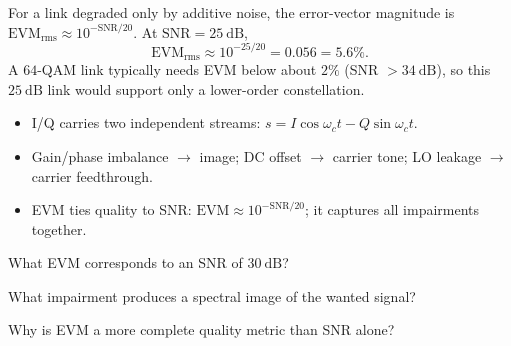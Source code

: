 \begin{workedexample}
For a link degraded only by additive noise, the error-vector magnitude is
$\text{EVM}_{\text{rms}} \approx 10^{-\text{SNR}/20}$. At $\text{SNR} = 25\ \text{dB}$,
\[ \text{EVM}_{\text{rms}} \approx 10^{-25/20} = 0.056 = 5.6\%. \]
A $64$-QAM link typically needs EVM below about $2\%$ (SNR $>34\ \text{dB}$), so
this $25\ \text{dB}$ link would support only a lower-order constellation.
\end{workedexample}

\begin{keytakeaways}
\begin{itemize}[leftmargin=1.4em,itemsep=2pt]
\item I/Q carries two independent streams: $s = I\cos\omega_c t - Q\sin\omega_c t$.
\item Gain/phase imbalance $\to$ image; DC offset $\to$ carrier tone; LO leakage $\to$ carrier feedthrough.
\item EVM ties quality to SNR: $\text{EVM}\approx 10^{-\text{SNR}/20}$; it captures all impairments together.
\end{itemize}
\end{keytakeaways}

\begin{exercises}
\item What EVM corresponds to an SNR of $30\ \text{dB}$?
\item What impairment produces a spectral image of the wanted signal?
\item Why is EVM a more complete quality metric than SNR alone?
\end{exercises}

